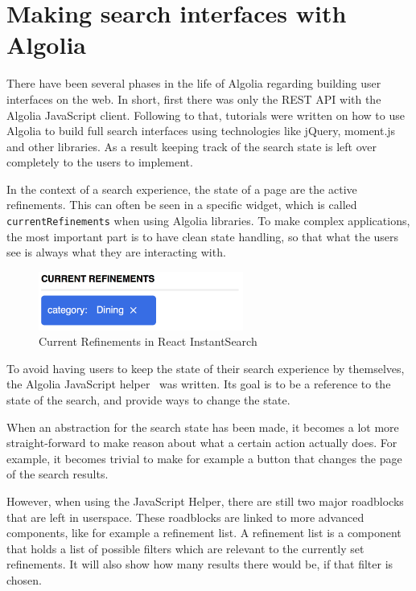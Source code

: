 \section{Making search interfaces with Algolia} %
\label{sec:making_search_interfaces_with_algolia}

There have been several phases in the life of Algolia regarding building user interfaces on the web. In short, first there was only the REST API with the Algolia JavaScript client. Following to that, tutorials were written on how to use Algolia to build full search interfaces using technologies like jQuery, moment.js and other libraries. As a result keeping track of the search state is left over completely to the users to implement.

In the context of a search experience, the state of a page are the active refinements. This can often be seen in a specific widget, which is called {\tt currentRefinements} when using Algolia libraries. To make complex applications, the most important part is to have clean state handling, so that what the users see is always what they are interacting with.

\begin{figure}[H]
\label{figure:current-refinements}
  \centering
  \includegraphics[width=0.6\textwidth]{../assets/current-refinements.png}
  \caption{Current Refinements in React InstantSearch\cite{ris-storybooks}}
\end{figure}

To avoid having users to keep the state of their search experience by themselves, the Algolia JavaScript helper~\cite{algolia-js-helper} was written. Its goal is to be a reference to the state of the search, and provide ways to change the state.

When an abstraction for the search state has been made, it becomes a lot more straight-forward to make reason about what a certain action actually does. For example, it becomes trivial to make for example a button that changes the page of the search results.

However, when using the JavaScript Helper, there are still two major roadblocks that are left in userspace. These roadblocks are linked to more advanced components, like for example a refinement list. A refinement list is a component that holds a list of possible filters which are relevant to the currently set refinements. It will also show how many results there would be, if that filter is chosen.

